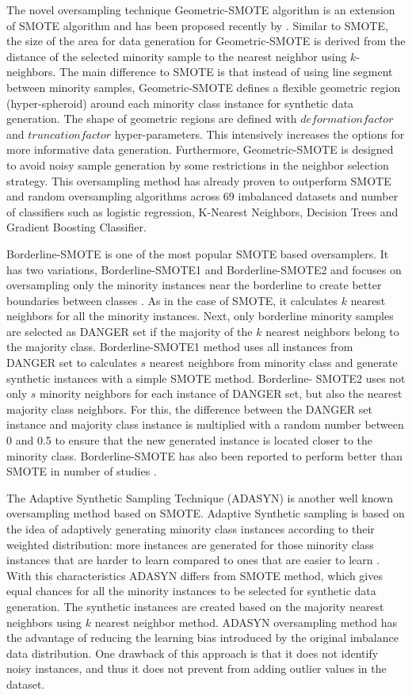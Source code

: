 \documentclass[parskip=full]{scrartcl}
\begin{document}
The novel oversampling technique Geometric-SMOTE algorithm is an extension of
SMOTE algorithm and has been proposed recently by \cite{Douzas2019}. Similar to
SMOTE, the size of the area for data generation for Geometric-SMOTE is derived
from the distance of the selected minority sample to the nearest neighbor using
$k$-neighbors. The main difference to SMOTE is that instead of using line
segment between minority samples, Geometric-SMOTE defines a flexible geometric
region (hyper-spheroid) around each minority class instance for synthetic data
generation. The shape of geometric regions are defined with $deformation factor$
and $truncation factor$ hyper-parameters. This intensively increases the options
for more informative data generation. Furthermore, Geometric-SMOTE is designed
to avoid noisy sample generation by some restrictions in the neighbor selection
strategy. This oversampling method has already proven to outperform SMOTE and
random oversampling algorithms across 69 imbalanced datasets and number of
classifiers such as logistic regression, K-Nearest Neighbors, Decision Trees and
Gradient Boosting Classifier.

Borderline-SMOTE is one of the most popular SMOTE based oversamplers. It has two
variations, Borderline-SMOTE1 and Borderline-SMOTE2 and focuses on oversampling
only the minority instances near the borderline to create better boundaries
between classes \cite{Han2005}. As in the case of SMOTE, it calculates $k$
nearest neighbors for all the minority instances. Next, only borderline minority
samples are selected as DANGER set if the majority of the $k$ nearest neighbors
belong to the majority class. Borderline-SMOTE1 method uses all instances from
DANGER set to calculates $s$ nearest neighbors from minority class and generate
synthetic instances with a simple SMOTE method. Borderline- SMOTE2 uses not only
$s$ minority neighbors for each instance of DANGER set, but also the nearest
majority class neighbors. For this, the difference between the DANGER set
instance and majority class instance is multiplied with a random number between
0 and 0.5 to ensure that the new generated instance is located closer to the
minority class. Borderline-SMOTE has also been reported to perform better than
SMOTE in number of studies \cite{Nguyen2009, Ramentol2012}.

The Adaptive Synthetic Sampling Technique (ADASYN) is another well known
oversampling method based on SMOTE. Adaptive Synthetic sampling is based on the
idea of adaptively generating minority class instances according to their
weighted distribution: more instances are generated for those minority class
instances that are harder to learn compared to ones that are easier to learn
\cite{HaiboHe2008}. With this characteristics ADASYN differs from SMOTE method,
which gives equal chances for all the minority instances to be selected for
synthetic data generation. The synthetic instances are created based on the
majority nearest neighbors using $k$ nearest neighbor method. ADASYN
oversampling method has the advantage of reducing the learning bias introduced
by the original imbalance data distribution. One drawback of this approach is
that it does not identify noisy instances, and thus it does not prevent from
adding outlier values in the dataset.
\end{document}
